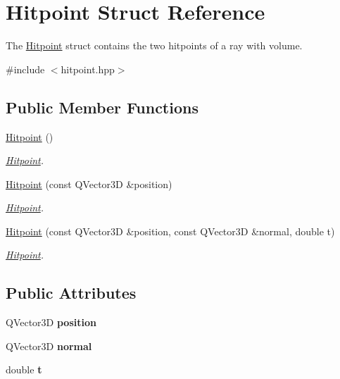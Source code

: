 \hypertarget{struct_hitpoint}{}\section{Hitpoint Struct Reference}
\label{struct_hitpoint}


The \mbox{\hyperlink{struct_hitpoint}{Hitpoint}} struct contains the two hitpoints of a ray with volume.  




{\ttfamily \#include $<$hitpoint.\+hpp$>$}

\subsection*{Public Member Functions}
\begin{DoxyCompactItemize}
\item 
\mbox{\label{struct_hitpoint_a8bccb7ee01b77bdefba3e37f11b8e8b7}} 
\mbox{\hyperlink{struct_hitpoint_a8bccb7ee01b77bdefba3e37f11b8e8b7}{Hitpoint}} ()
\begin{DoxyCompactList}\small\item\em \mbox{\hyperlink{struct_hitpoint}{Hitpoint}}. \end{DoxyCompactList}\item 
\mbox{\hyperlink{struct_hitpoint_a544329fb8b4556202074ff60f941a1cc}{Hitpoint}} (const Q\+Vector3D \&position)
\begin{DoxyCompactList}\small\item\em \mbox{\hyperlink{struct_hitpoint}{Hitpoint}}. \end{DoxyCompactList}\item 
\mbox{\hyperlink{struct_hitpoint_a7f098fb5a60e88c5f0ff5ce1d3161b84}{Hitpoint}} (const Q\+Vector3D \&position, const Q\+Vector3D \&normal, double t)
\begin{DoxyCompactList}\small\item\em \mbox{\hyperlink{struct_hitpoint}{Hitpoint}}. \end{DoxyCompactList}\end{DoxyCompactItemize}
\subsection*{Public Attributes}
\begin{DoxyCompactItemize}
\item 
\mbox{\label{struct_hitpoint_ab843d522bc585010bd61715feba760ba}} 
Q\+Vector3D {\bfseries position}
\item 
\mbox{\label{struct_hitpoint_aaea463dd226da74d5c5d730409b77509}} 
Q\+Vector3D {\bfseries normal}
\item 
\mbox{\label{struct_hitpoint_a794dfaeecbe50280b13af9171b335abe}} 
double {\bfseries t}
\end{DoxyCompactItemize}


